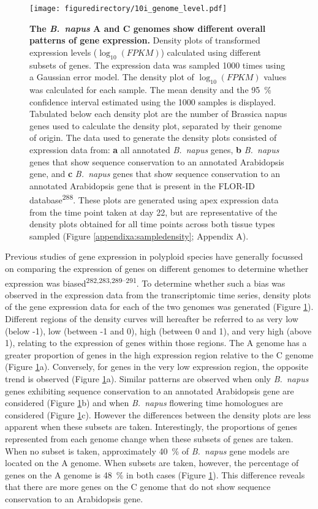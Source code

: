 \documentclass[12pt,]{book}
\begin{document}
\begin{figure}[htbp]
\centering
\texttt{[image: figuredirectory/10i\_genome\_level.pdf]}
\caption{\textbf{The \emph{B.~napus} A and C genomes show different
overall patterns of gene expression.} Density plots of transformed
expression levels (\(\log_{10}(FPKM)\)) calculated using different
subsets of genes. The expression data was sampled 1000 times using a
Gaussian error model. The density plot of \(\log_{10}(FPKM)\) values was
calculated for each sample. The mean density and the 95~\% confidence
interval estimated using the 1000 samples is displayed. Tabulated below
each density plot are the number of Brassica napus genes used to
calculate the density plot, separated by their genome of origin. The
data used to generate the density plots consisted of expression data
from: \textbf{a} all annotated \emph{B.~napus} genes, \textbf{b}
\emph{B.~napus} genes that show sequence conservation to an annotated
Arabidopsis gene, and \textbf{c} \emph{B.~napus} genes that show
sequence conservation to an annotated Arabidopsis gene that is present
in the FLOR-ID database\textsuperscript{288}. These plots are generated
using apex expression data from the time point taken at day 22, but are
representative of the density plots obtained for all time points across
both tissue types sampled (Figure \ref{appendixa:sampledensity};
Appendix A).}\label{figure:210:genomeexp}
\end{figure}

Previous studies of gene expression in polyploid species have generally
focussed on comparing the expression of genes on different genomes to
determine whether expression was
biased\textsuperscript{282,283,289--291}. To determine whether such a
bias was observed in the expression data from the transcriptomic time
series, density plots of the gene expression data for each of the two
genomes was generated (Figure \ref{figure:210:genomeexp}). Different
regions of the density curves will hereafter be referred to as very low
(below -1), low (between -1 and 0), high (between 0 and 1), and very
high (above 1), relating to the expression of genes within those
regions. The A genome has a greater proportion of genes in the high
expression region relative to the C genome (Figure
\ref{figure:210:genomeexp}a). Conversely, for genes in the very low
expression region, the opposite trend is observed (Figure
\ref{figure:210:genomeexp}a). Similar patterns are observed when only
\emph{B.~napus} genes exhibiting sequence conservation to an annotated
Arabidopsis gene are considered (Figure \ref{figure:210:genomeexp}b) and
when \emph{B.~napus} flowering time homologues are considered (Figure
\ref{figure:210:genomeexp}c). However the differences between the
density plots are less apparent when these subsets are taken.
Interestingly, the proportions of genes represented from each genome
change when these subsets of genes are taken. When no subset is taken,
approximately 40~\% of \emph{B.~napus} gene models are located on the A
genome. When subsets are taken, however, the percentage of genes on the
A genome is 48~\% in both cases (Figure \ref{figure:210:genomeexp}).
This difference reveals that there are more genes on the C genome that
do not show sequence conservation to an Arabidopsis gene.
\end{document}

